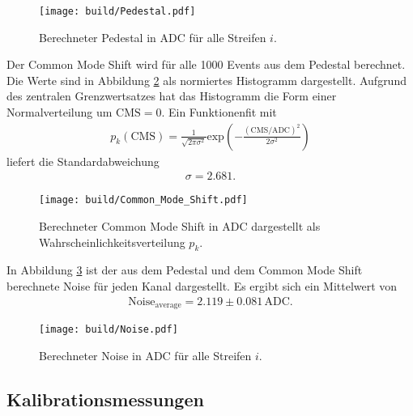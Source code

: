\begin{figure}
  \centering
  \texttt{[image: build/Pedestal.pdf]}
  \caption{Berechneter Pedestal in ADC für alle Streifen $i$.}
  \label{fig:pedestals}
\end{figure}

Der Common Mode Shift wird für alle 1000 Events aus dem Pedestal berechnet.
Die Werte sind in Abbildung \ref{fig:cms} als normiertes Histogramm dargestellt.
Aufgrund des zentralen Grenzwertsatzes hat das Histogramm die Form einer Normalverteilung um $\text{CMS} = 0$.
Ein Funktionenfit mit
\begin{align}
  p_k(\text{CMS}) = \frac{1}{\sqrt{2 \pi \sigma^2}} \text{exp} \left(-\frac{(\text{CMS}/\text{ADC})^2}{2\sigma^2}\right)
  \label{eqn:gauß}
\end{align}
liefert die Standardabweichung
\begin{align}
  \sigma = 2.681.
\end{align}

\begin{figure}
  \centering
  \texttt{[image: build/Common\_Mode\_Shift.pdf]}
  \caption{Berechneter Common Mode Shift in ADC dargestellt als Wahrscheinlichkeitsverteilung $p_k$.}
  \label{fig:cms}
\end{figure}

In Abbildung \ref{fig:noise} ist der aus dem Pedestal und dem Common Mode Shift berechnete Noise für jeden Kanal
dargestellt. Es ergibt sich ein Mittelwert von
\begin{align}
  \text{Noise}_\text{average} = 2.119 \pm 0.081 \, \text{ADC}.
\end{align}

\begin{figure}
  \centering
  \texttt{[image: build/Noise.pdf]}
  \caption{Berechneter Noise in ADC für alle Streifen $i$.}
  \label{fig:noise}
\end{figure}

\subsection{Kalibrationsmessungen}

